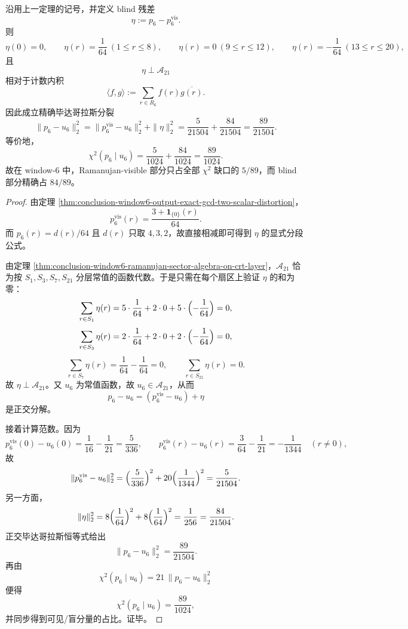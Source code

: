\begin{theorem}\label{thm:conclusion-window6-output-chi2-visible-blind-orthogonal-splitting}
沿用上一定理的记号，并定义 blind 残差
\[
\eta:=p_6-p_6^{\mathrm{vis}}.
\]
则
\[
\eta(0)=0,\qquad
\eta(r)=\frac1{64}\ (1\le r\le 8),\qquad
\eta(r)=0\ (9\le r\le 12),\qquad
\eta(r)=-\frac1{64}\ (13\le r\le 20),
\]
且
\[
\eta\perp \mathcal A_{21}
\]
相对于计数内积
\[
\langle f,g\rangle:=\sum_{r\in R_6}f(r)\overline{g(r)}.
\]
因此成立精确毕达哥拉斯分裂
\[
\boxed{\;
\|p_6-u_6\|_2^2
=
\|p_6^{\mathrm{vis}}-u_6\|_2^2+\|\eta\|_2^2
=
\frac{5}{21504}+\frac{84}{21504}
=
\frac{89}{21504}.\;}
\]
等价地，
\[
\boxed{\;
\chi^2(p_6\mid u_6)
=
\frac{5}{1024}+\frac{84}{1024}
=
\frac{89}{1024}.\;}
\]
故在 window-\(6\) 中，Ramanujan-visible 部分只占全部 \(\chi^2\) 缺口的 \(5/89\)，而 blind 部分精确占 \(84/89\)。
\end{theorem}
\begin{proof}
由定理 \ref{thm:conclusion-window6-output-exact-gcd-two-scalar-distortion}，
\[
p_6^{\mathrm{vis}}(r)=\frac{3+\mathbf 1_{\{0\}}(r)}{64}.
\]
而 \(p_6(r)=d(r)/64\) 且 \(d(r)\) 只取 \(4,3,2\)，故直接相减即可得到 \(\eta\) 的显式分段公式。

由定理 \ref{thm:conclusion-window6-ramanujan-sector-algebra-on-crt-layer}，\(\mathcal A_{21}\) 恰为按 \(S_1,S_3,S_7,S_{21}\) 分层常值的函数代数。于是只需在每个扇区上验证 \(\eta\) 的和为零：
\[
\sum_{r\in S_1}\eta(r)=5\cdot\frac1{64}+2\cdot 0+5\cdot\Bigl(-\frac1{64}\Bigr)=0,
\]
\[
\sum_{r\in S_3}\eta(r)=2\cdot\frac1{64}+2\cdot 0+2\cdot\Bigl(-\frac1{64}\Bigr)=0,
\]
\[
\sum_{r\in S_7}\eta(r)=\frac1{64}-\frac1{64}=0,
\qquad
\sum_{r\in S_{21}}\eta(r)=0.
\]
故 \(\eta\perp \mathcal A_{21}\)。又 \(u_6\) 为常值函数，故 \(u_6\in \mathcal A_{21}\)，从而
\[
p_6-u_6=(p_6^{\mathrm{vis}}-u_6)+\eta
\]
是正交分解。

接着计算范数。因为
\[
p_6^{\mathrm{vis}}(0)-u_6(0)=\frac1{16}-\frac1{21}=\frac{5}{336},
\qquad
p_6^{\mathrm{vis}}(r)-u_6(r)=\frac3{64}-\frac1{21}=-\frac1{1344}\quad(r\neq 0),
\]
故
\[
\|p_6^{\mathrm{vis}}-u_6\|_2^2
=
\Bigl(\frac{5}{336}\Bigr)^2+20\Bigl(\frac{1}{1344}\Bigr)^2
=
\frac{5}{21504}.
\]
另一方面，
\[
\|\eta\|_2^2
=
8\Bigl(\frac1{64}\Bigr)^2+8\Bigl(\frac1{64}\Bigr)^2
=
\frac1{256}
=
\frac{84}{21504}.
\]
正交毕达哥拉斯恒等式给出
\[
\|p_6-u_6\|_2^2=\frac{89}{21504}.
\]
再由
\[
\chi^2(p_6\mid u_6)=21\,\|p_6-u_6\|_2^2
\]
便得
\[
\chi^2(p_6\mid u_6)=\frac{89}{1024},
\]
并同步得到可见/盲分量的占比。证毕。
\end{proof}


